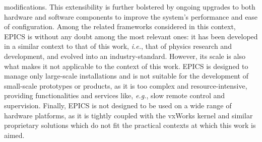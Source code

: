modifications. This extensibility is further bolstered by ongoing upgrades to both hardware and software components to improve the system's performance and ease of configuration. Among the related frameworks considered in this context, EPICS is without any doubt among the most relevant ones: it has been developed in a similar context to that of this work, \emph{i.e.}, that of physics research and development, and evolved into an industry-standard. However, its scale is also what makes it not applicable to the context of this work. EPICS is designed to manage only large-scale installations and is not suitable for the development of small-scale prototypes or products, as it is too complex and resource-intensive, providing functionalities and services like, \emph{e.g.}, slow remote control and supervision. Finally, EPICS is not designed to be used on a wide range of hardware platforms, as it is tightly coupled with the vxWorks kernel and similar proprietary solutions which do not fit the practical contexts at which this work is aimed.

